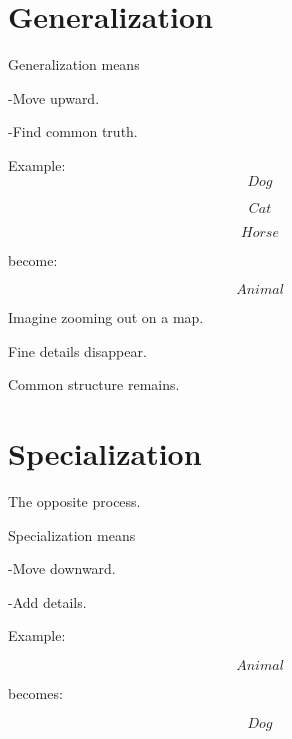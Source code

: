 \documentclass[11pt,a4paper]{book}
\begin{document}
\section{Generalization}

\begin{idea}

Generalization means

    -Move upward.

    -Find common truth.

\end{idea}


    Example:
\[Dog\]

\[Cat\]

\[Horse\]

    become:

\[Animal\]


\begin{mentalmodel}

Imagine zooming out on a map.

Fine details disappear.

Common structure remains.

\end{mentalmodel}


\section{Specialization}

The opposite process.


\begin{idea}

Specialization means

    -Move downward.
    
    -Add details.

\end{idea}


Example:

\[
Animal
\]

becomes:

\[
Dog
\]
\end{document}
